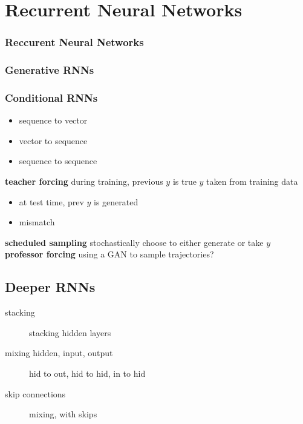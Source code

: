 \documentclass[]{article}
\theoremstyle{definition}
\begin{document}
    \section{Recurrent Neural Networks}%
    \label{sec:recurrent_neural_networks}

    \subsubsection{Reccurent Neural Networks}%
    \label{ssub:reccurent_neural_networks}

    \subsubsection{Generative RNNs}%
    \label{ssub:generative_rnns}


    \subsubsection{Conditional RNNs}%
    \label{ssub:conditional_rnns}

    \begin{itemize}
        \item sequence to vector
        \item vector to sequence
        \item sequence to sequence
    \end{itemize}

    \textbf{teacher forcing} during training, previous $y$ is true $y$ taken from training data
    \begin{itemize}
        \item at test time, prev $y$ is generated
        \item mismatch
    \end{itemize}
    \textbf{scheduled sampling} stochastically choose to either generate or take $y$
    \textbf{professor forcing} using a GAN to sample trajectories?


    \subsection{Deeper RNNs}%
    \label{sub:deeper_rnns}

    \begin{description}
        \item[stacking] stacking hidden layers
        \item[mixing hidden, input, output] hid to out, hid to hid, in to hid
        \item[skip connections] mixing, with skips
    \end{description}
\end{document}
